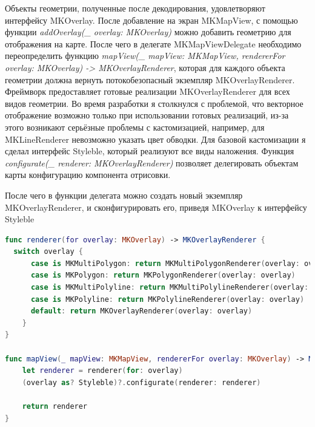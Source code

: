       Объекты геометрии, полученные после декодирования, удовлетворяют интерфейсу MKOverlay. После добавление на экран MKMapView, с помощью функции \textit{addOverlay(\_ overlay: MKOverlay)} можно добавить геометрию для отображения на карте. После чего в делегате MKMapViewDelegate необходимо переопределить функцию \textit{mapView(\_ mapView: MKMapView, rendererFor overlay: MKOverlay) -> MKOverlayRenderer}, которая для каждого объекта геометрии должна вернуть потокобезопасный экземпляр MKOverlayRenderer. Фреймворк предоставляет готовые реализации MKOverlayRenderer для всех видов геометрии. Во время разработки я столкнулся с проблемой, что векторное отображение возможно только при использовании готовых реализаций, из-за этого возникают серьёзные проблемы с кастомизацией, например, для MKLineRenderer невозможно указать цвет обводки.
      Для базовой кастомизации я сделал интерфейс Styleble, который реализуют все виды наложения. Функция \textit{configurate(\_ renderer: MKOverlayRenderer)} позволяет делегировать объектам карты конфигурацию компонента отрисовки.


      После чего в функции делегата можно создать новый экземпляр MKOverlayRenderer, и сконфигурировать его, приведя MKOverlay к интерфейсу Styleble

      \begin{lstlisting}[language=swift,caption={Реализация функции создания и конфигурации компонентов MKOverlayRenderer}]
func renderer(for overlay: MKOverlay) -> MKOverlayRenderer {
  switch overlay {
      case is MKMultiPolygon: return MKMultiPolygonRenderer(overlay: overlay)
      case is MKPolygon: return MKPolygonRenderer(overlay: overlay)
      case is MKMultiPolyline: return MKMultiPolylineRenderer(overlay: overlay)
      case is MKPolyline: return MKPolylineRenderer(overlay: overlay)
      default: return MKOverlayRenderer(overlay: overlay)
    }
}

func mapView(_ mapView: MKMapView, rendererFor overlay: MKOverlay) -> MKOverlayRenderer {
    let renderer = renderer(for: overlay)
    (overlay as? Styleble)?.configurate(renderer: renderer)

    return renderer
}
      \end{lstlisting}

